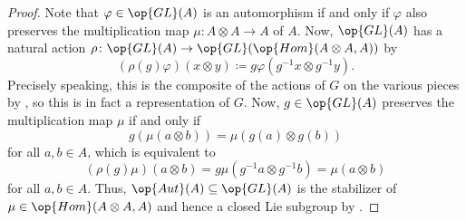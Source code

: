 \documentclass[../notes.tex]{subfiles}
\begin{document}
\begin{proof}
	Note that $\varphi\in\op{GL}(A)$ is an automorphism if and only if $\varphi$ also preserves the multiplication map $\mu\colon A\otimes A\to A$ of $A$. Now, $\op{GL}(A)$ has a natural action $\rho\colon\op{GL}(A)\to\op{GL}(\op{Hom}(A\otimes A,A))$ by
	\[(\rho(g)\varphi)(x\otimes y)\coloneqq g\varphi\left(g^{-1}x\otimes g^{-1}y\right).\]
	Precisely speaking, this is the composite of the actions of $G$ on the various pieces by , so this is in fact a representation of $G$. Now, $g\in\op{GL}(A)$ preserves the multiplication map $\mu$ if and only if
	\[g(\mu(a\otimes b))=\mu(g(a)\otimes g(b))\]
	for all $a,b\in A$, which is equivalent to
	\[(\rho(g)\mu)(a\otimes b)=g\mu\left(g^{-1}a\otimes g^{-1}b\right)=\mu(a\otimes b)\]
	for all $a,b\in A$. Thus, $\op{Aut}(A)\subseteq\op{GL}(A)$ is the stabilizer of $\mu\in\op{Hom}(A\otimes A,A)$ and hence a closed Lie subgroup by .


\end{proof}
\end{document}
